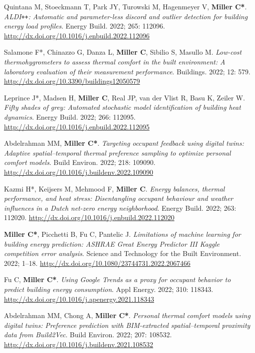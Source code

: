 \documentclass[10pt,a4paper]{article}
\begin{document}
\begin{small}
\begin{etaremune}
\item
Quintana M, Stoeckmann T, Park JY, Turowski M, Hagenmeyer V, \textbf{Miller C*}. \emph{ALDI\texttt{+}\texttt{+}: Automatic and parameter-less discord and outlier detection for building energy load profiles}. Energy Build. 2022; 265: 112096. \url{http://dx.doi.org/10.1016/j.enbuild.2022.112096}
\item
Salamone F*, Chinazzo G, Danza L, \textbf{Miller C}, Sibilio S, Masullo M. \emph{Low-cost thermohygrometers to assess thermal comfort in the built environment: A laboratory evaluation of their measurement performance}. Buildings. 2022; 12: 579. \url{http://dx.doi.org/10.3390/buildings12050579}
\item
Leprince J*, Madsen H, \textbf{Miller C}, Real JP, van der Vlist R, Basu K, Zeiler W. \emph{Fifty shades of grey: Automated stochastic model identification of building heat dynamics}. Energy Build. 2022; 266: 112095. \url{http://dx.doi.org/10.1016/j.enbuild.2022.112095}
\item
Abdelrahman MM, \textbf{Miller C*}. \emph{Targeting occupant feedback using digital twins: Adaptive spatial–temporal thermal preference sampling to optimize personal comfort models}. Build Environ. 2022; 218: 109090. \url{http://dx.doi.org/10.1016/j.buildenv.2022.109090}
\item
Kazmi H*, Keijsers M, Mehmood F, \textbf{Miller C}. \emph{Energy balances, thermal performance, and heat stress: Disentangling occupant behaviour and weather influences in a Dutch net-zero energy neighborhood}. Energy Build. 2022; 263: 112020. \url{http://dx.doi.org/10.1016/j.enbuild.2022.112020}
\item
\textbf{Miller C*}, Picchetti B, Fu C, Pantelic J. \emph{Limitations of machine learning for building energy prediction: ASHRAE Great Energy Predictor III Kaggle competition error analysis}. Science and Technology for the Built Environment. 2022; 1–18. \url{http://dx.doi.org/10.1080/23744731.2022.2067466}
\item
Fu C, \textbf{Miller C*}. \emph{Using Google Trends as a proxy for occupant behavior to predict building energy consumption}. Appl Energy. 2022; 310: 118343. \url{http://dx.doi.org/10.1016/j.apenergy.2021.118343}
\item
Abdelrahman MM, Chong A, \textbf{Miller C*}. \emph{Personal thermal comfort models using digital twins: Preference prediction with BIM-extracted spatial–temporal proximity data from Build2Vec}. Build Environ. 2022; 207: 108532. \url{http://dx.doi.org/10.1016/j.buildenv.2021.108532}

\end{etaremune}
\end{small}
\end{document}
